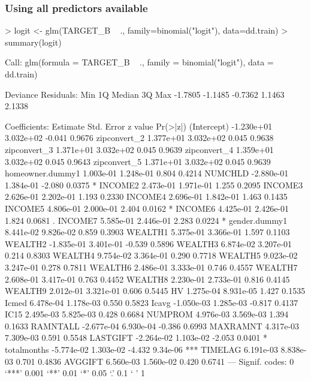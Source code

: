\documentclass{article}
\begin{document}
\subsubsection*{Using all predictors available}
\begin{Schunk}
\begin{Sinput}
> logit <- glm(TARGET_B ~ ., family=binomial("logit"), data=dd.train)
> summary(logit)
\end{Sinput}
\begin{Soutput}
Call:
glm(formula = TARGET_B ~ ., family = binomial("logit"), data = dd.train)

Deviance Residuals: 
    Min       1Q   Median       3Q      Max  
-1.7805  -1.1485  -0.7362   1.1463   2.1338  

Coefficients:
                   Estimate Std. Error z value Pr(>|z|)    
(Intercept)      -1.230e+01  3.032e+02  -0.041   0.9676    
zipconvert_2      1.377e+01  3.032e+02   0.045   0.9638    
zipconvert_3      1.371e+01  3.032e+02   0.045   0.9639    
zipconvert_4      1.359e+01  3.032e+02   0.045   0.9643    
zipconvert_5      1.371e+01  3.032e+02   0.045   0.9639    
homeowner.dummy1  1.003e-01  1.248e-01   0.804   0.4214    
NUMCHLD          -2.880e-01  1.384e-01  -2.080   0.0375 *  
INCOME2           2.473e-01  1.971e-01   1.255   0.2095    
INCOME3           2.626e-01  2.202e-01   1.193   0.2330    
INCOME4           2.696e-01  1.842e-01   1.463   0.1435    
INCOME5           4.806e-01  2.000e-01   2.404   0.0162 *  
INCOME6           4.425e-01  2.426e-01   1.824   0.0681 .  
INCOME7           5.585e-01  2.446e-01   2.283   0.0224 *  
gender.dummy1     8.441e-02  9.826e-02   0.859   0.3903    
WEALTH1           5.375e-01  3.366e-01   1.597   0.1103    
WEALTH2          -1.835e-01  3.401e-01  -0.539   0.5896    
WEALTH3           6.874e-02  3.207e-01   0.214   0.8303    
WEALTH4           9.754e-02  3.364e-01   0.290   0.7718    
WEALTH5           9.023e-02  3.247e-01   0.278   0.7811    
WEALTH6           2.486e-01  3.333e-01   0.746   0.4557    
WEALTH7           2.608e-01  3.417e-01   0.763   0.4452    
WEALTH8           2.230e-01  2.733e-01   0.816   0.4145    
WEALTH9           2.012e-01  3.321e-01   0.606   0.5445    
HV                1.275e-04  8.931e-05   1.427   0.1535    
Icmed             6.478e-04  1.178e-03   0.550   0.5823    
Icavg            -1.050e-03  1.285e-03  -0.817   0.4137    
IC15              2.495e-03  5.825e-03   0.428   0.6684    
NUMPROM           4.976e-03  3.569e-03   1.394   0.1633    
RAMNTALL         -2.677e-04  6.930e-04  -0.386   0.6993    
MAXRAMNT          4.317e-03  7.309e-03   0.591   0.5548    
LASTGIFT         -2.264e-02  1.103e-02  -2.053   0.0401 *  
totalmonths      -5.774e-02  1.303e-02  -4.432 9.34e-06 ***
TIMELAG           6.191e-03  8.838e-03   0.701   0.4836    
AVGGIFT           6.560e-03  1.560e-02   0.420   0.6741    
---
Signif. codes:  0 ‘***’ 0.001 ‘**’ 0.01 ‘*’ 0.05 ‘.’ 0.1 ‘ ’ 1


\end{Soutput}
\end{Schunk}
\end{document}

